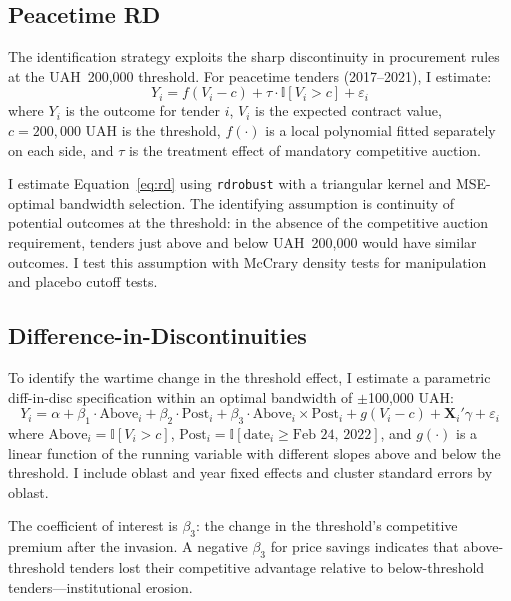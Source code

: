 \documentclass[12pt]{article}
\newcommand{\ind}{\mathbb{I}}
\begin{document}
\subsection{Peacetime RD}

The identification strategy exploits the sharp discontinuity in procurement rules at the UAH~200,000 threshold. For peacetime tenders (2017--2021), I estimate:
\begin{equation}
Y_i = f(V_i - c) + \tau \cdot \ind[V_i > c] + \varepsilon_i
\label{eq:rd}
\end{equation}
where $Y_i$ is the outcome for tender $i$, $V_i$ is the expected contract value, $c = 200{,}000$ UAH is the threshold, $f(\cdot)$ is a local polynomial fitted separately on each side, and $\tau$ is the treatment effect of mandatory competitive auction.

I estimate Equation~\ref{eq:rd} using \texttt{rdrobust} \citep{Cattaneo2020} with a triangular kernel and MSE-optimal bandwidth selection. The identifying assumption is continuity of potential outcomes at the threshold: in the absence of the competitive auction requirement, tenders just above and below UAH~200,000 would have similar outcomes. I test this assumption with McCrary density tests for manipulation \citep{McCrary2008, Cattaneo2020density} and placebo cutoff tests.

\subsection{Difference-in-Discontinuities}

To identify the wartime change in the threshold effect, I estimate a parametric diff-in-disc specification within an optimal bandwidth of $\pm$100,000 UAH:
\begin{equation}
Y_i = \alpha + \beta_1 \cdot \text{Above}_i + \beta_2 \cdot \text{Post}_i + \beta_3 \cdot \text{Above}_i \times \text{Post}_i + g(V_i - c) + \mathbf{X}_i'\gamma + \varepsilon_i
\label{eq:did}
\end{equation}
where $\text{Above}_i = \ind[V_i > c]$, $\text{Post}_i = \ind[\text{date}_i \geq \text{Feb 24, 2022}]$, and $g(\cdot)$ is a linear function of the running variable with different slopes above and below the threshold. I include oblast and year fixed effects and cluster standard errors by oblast.

The coefficient of interest is $\beta_3$: the change in the threshold's competitive premium after the invasion. A negative $\beta_3$ for price savings indicates that above-threshold tenders lost their competitive advantage relative to below-threshold tenders---institutional erosion.
\end{document}
